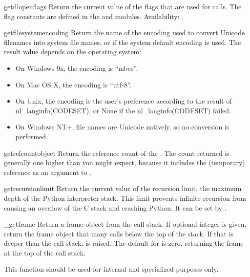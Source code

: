 \begin{funcdesc}{getdlopenflags}{}
  Return the current value of the flags that are used for
   calls. The flag constants are defined in the
   and  modules.
  Availability: \UNIX.
\end{funcdesc}

\begin{funcdesc}{getfilesystemencoding}{}
  Return the name of the encoding used to convert Unicode filenames
  into system file names, or  if the system default encoding
  is used. The result value depends on the operating system:
\begin{itemize}
\item On Windows 9x, the encoding is ``mbcs''.
\item On Mac OS X, the encoding is ``utf-8''.
\item On Unix, the encoding is the user's preference 
      according to the result of nl_langinfo(CODESET), or None if
      the nl_langinfo(CODESET) failed.
\item On Windows NT+, file names are Unicode natively, so no conversion
      is performed.
\end{itemize}
\end{funcdesc}

\begin{funcdesc}{getrefcount}{object}
  Return the reference count of the .  The count returned
  is generally one higher than you might expect, because it includes
  the (temporary) reference as an argument to
  .
\end{funcdesc}

\begin{funcdesc}{getrecursionlimit}{}
  Return the current value of the recursion limit, the maximum depth
  of the Python interpreter stack.  This limit prevents infinite
  recursion from causing an overflow of the C stack and crashing
  Python.  It can be set by .
\end{funcdesc}

\begin{funcdesc}{_getframe}{}
  Return a frame object from the call stack.  If optional integer
   is given, return the frame object that many calls below
  the top of the stack.  If that is deeper than the call stack,
   is raised.  The default for  is
  zero, returning the frame at the top of the call stack.

  This function should be used for internal and specialized purposes
  only.
\end{funcdesc}


